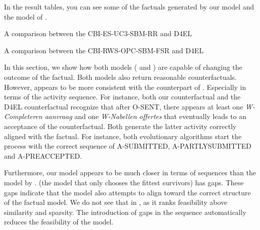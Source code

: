 \documentclass[./../../paper.tex]{subfiles}
\begin{document}
In the result tables, you can see some of the factuals generated by our model and the model of \cite{hsieh_DiCE4ELInterpretingProcess_2021}.  

\begin{table}
    \centering    
    \resizebox{\linewidth}{!}{
    
    }
    \caption{A comparison between the CBI-ES-UC3-SBM-RR and D4EL}
    \label{fig:exp7-RR}
\end{table}
\begin{table}
    \centering    
    \resizebox{\linewidth}{!}{
    
    }
\caption{A comparison between the CBI-RWS-OPC-SBM-FSR and D4EL}
\label{fig:exp7-FSR}
\end{table}

% 

% 

% 

In this section, we show how both models ( and ) are capable of changing the outcome of the factual. Both models also return reasonable counterfactuals. However,  appears to be more consistent with the counterpart of \cite{hsieh_DiCE4ELInterpretingProcess_2021}. Especially in terms of the activity sequence. 
For instance, both our counterfactual and the D4EL counterfactual recognize that after O-SENT, there appears at least one \emph{W-Completeren aanvraag} and one \emph{W-Nabellen offertes} that eventually leads to an acceptance of the counterfactual. Both generate the latter activity correctly aligned with the factual. 
For instance, both evolutionary algorithms start the process with the correct sequence of A-SUBMITTED, A-PARTLYSUBMITTED and A-PREACCEPTED. 

Furthermore, our model appears to be much closer in terms of sequences than the model by \citeauthor{hsieh_DiCE4ELInterpretingProcess_2021}.  (the model that only chooses the fittest survivors) has gaps. These gaps indicate that the model also attempts to align toward the correct structure of the factual model. We do not see that in , as it ranks feasibility above similarity and sparsity. The introduction of gaps in the sequence automatically reduces the feasibility of the model. 
\end{document}

